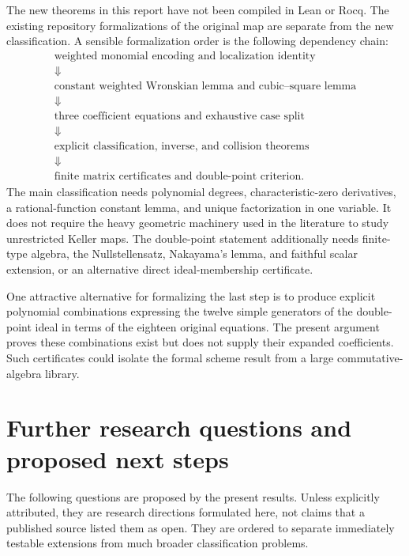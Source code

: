 \documentclass[11pt,a4paper]{article}
\numberwithin{equation}{section}
\theoremstyle{definition}
\theoremstyle{remark}
\begin{document}
The new theorems in this report have not been compiled in Lean or Rocq.
The existing repository formalizations of the original map are separate
from the new classification. A sensible formalization order is the
following dependency chain:
\[
\begin{gathered}
\text{weighted monomial encoding and localization identity}\\
\Downarrow\\
\text{constant weighted Wronskian lemma and cubic--square lemma}\\
\Downarrow\\
\text{three coefficient equations and exhaustive case split}\\
\Downarrow\\
\text{explicit classification, inverse, and collision theorems}\\
\Downarrow\\
\text{finite matrix certificates and double-point criterion}.
\end{gathered}
\]
The main classification needs polynomial degrees, characteristic-zero
derivatives, a rational-function constant lemma, and unique factorization
in one variable. It does not require the heavy geometric machinery used
in the literature to study unrestricted Keller maps. The double-point
statement additionally needs finite-type algebra, the Nullstellensatz,
Nakayama's lemma, and faithful scalar extension, or an alternative direct
ideal-membership certificate.

One attractive alternative for formalizing the last step is to produce
explicit polynomial combinations expressing the twelve simple generators
of the double-point ideal in terms of the eighteen original equations.
The present argument proves these combinations exist but does not supply
their expanded coefficients. Such certificates could isolate the formal
scheme result from a large commutative-algebra library.

\section{Further research questions and proposed next steps}
\label{sec:future}

The following questions are proposed by the present results. Unless
explicitly attributed, they are research directions formulated here, not
claims that a published source listed them as open. They are ordered to
separate immediately testable extensions from much broader classification
problems.
\end{document}
